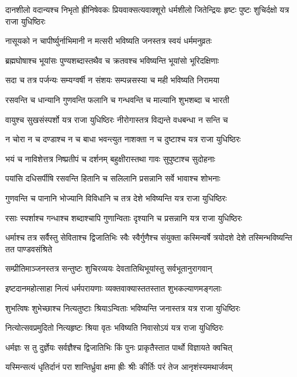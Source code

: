 \threelineshloka
{दानशीलो वदान्यश्च निभृतो ह्रीनिषेवकः}
{प्रियवाक्सत्यवाक्शूरो धर्मशीलो जितेन्द्रियः}
{हृष्टः पुष्टः शुचिर्दक्षो यत्र राजा युधिष्ठिरः}


\twolineshloka
{नासूयको न चापीर्ष्युर्नाभिमानी न मत्सरी}
{भविष्यति जनस्तत्र स्वयं धर्ममनुव्रतः}


\twolineshloka
{ब्रह्मघोषाश्च भूयांसः पुण्यशब्दास्तथैव च}
{क्रतवश्च भविष्यन्ति भूयांसो भूरिदक्षिणाः}


\twolineshloka
{सदा च तत्र पर्जन्यः सम्यग्वर्षी न संशयः}
{सम्पन्नसस्या च मही भविष्यति निरामया}


\twolineshloka
{रसवन्ति च धान्यानि गुणवन्ति फलानि च}
{गन्धवन्ति च माल्यानि शुभशब्दा च भारती}


\twolineshloka
{वायुश्च सुखसंस्पर्शो यत्र राजा युधिष्ठिरः}
{नीरोगास्तत्र विद्यन्ते वधबन्धा न सन्ति च}


\twolineshloka
{न चोरा न च दण्डाश्च न च बाधा भवन्त्युत}
{नाशक्ता न च दुष्टाश्च यत्र राजा युधिष्ठिरः}


\twolineshloka
{भयं च नाविशेत्तत्र निष्प्रतीपं च दर्शनम्}
{बहुक्षीरास्तथा गावः सुपुष्टाश्च सुदोहनाः}


\twolineshloka
{पयांसि दधिसर्पीषि रसवन्ति हितानि च}
{सलिलानि प्रसन्नानि सर्वे भावाश्च शोभनाः}


\twolineshloka
{गुणवन्ति च पानानि भोज्यानि विविधानि च}
{तत्र देशे भविष्यन्ति यत्र राजा युधिष्ठिरः}


\twolineshloka
{रसाः स्पर्शाश्च गन्धाश्च शब्दाश्चापि गुणान्विताः}
{दृश्यानि च प्रसन्नानि यत्र राजा युधिष्ठिरः}


\threelineshloka
{धर्माश्च तत्र सर्वैस्तु सेविताश्च द्विजातिभिः}
{स्वैः स्वैर्गुणैश्च संयुक्ता कस्मिन्वर्षे त्रयोदशे}
{देशे तस्मिन्भविष्यन्ति तत पाण्डवसंश्रिते}


\twolineshloka
{सम्प्रीतिमाञ्जनस्तत्र सन्तुष्टः शुचिरव्ययः}
{देवतातिथिभूयांस्तु सर्वभूतानुरागवान्}


\twolineshloka
{इष्टदानमहोत्साहा नित्यं धर्मपरायणाः}
{व्यक्तवाक्यास्ततस्तात शुभकल्याणमङ्गलाः}


\twolineshloka
{शुभत्विषः शुभेच्छाश्च नित्यतुष्टाः श्रियाऽन्विताः}
{भविष्यन्ति जनास्तत्र यत्र राजा युधिष्ठिरः}


\twolineshloka
{नित्योत्सवप्रमुदितो नित्यहृष्टः श्रिया वृतः}
{भविष्यति निवासोऽयं यत्र राजा युधिष्ठिरः}


\twolineshloka
{धर्मज्ञः स तु दुर्ज्ञेयः सर्वज्ञैश्च द्विजातिभिः}
{किं पुनः प्राकृतैस्तात पार्थो विज्ञायते क्वचित्}


\twolineshloka
{यस्मिन्सत्यं धृतिर्दानं परा शान्तिर्ध्रुवा क्षमा}
{ह्रीः श्रीः कीर्तिः परं तेज आनृशंस्यमथार्जवम्}



